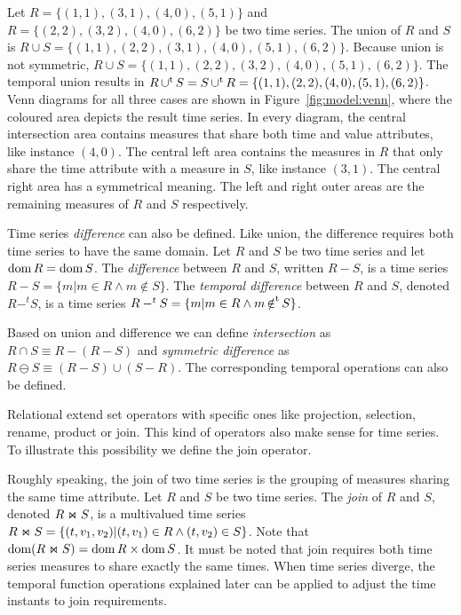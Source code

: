 \begin{example}\label{ex:model:s1s2}
  Let $R=\{(1,1), (3,1), (4,0), (5,1)\}$ and $R=\{(2,2), (3,2), (4,0),
  (6,2)\}$ be two time series. The union of $R$ and $S$ is $R\cup
  S=\{(1,1), (2,2), (3,1), (4,0), (5,1), (6,2)\}$. Because union is
  not symmetric, $R\cup S=\{(1,1), (2,2), \allowbreak(3,2), (4, 0), (5,1),
  (6,2)\}$. The temporal union results in $R\operatorname*{\cup^t} S= S \operatorname*{\cup^t}
  R=\{(1,1), (2,2), (4,0), (5,1), (6,2)\}$.  
  Venn diagrams for all three cases are shown in
  Figure~\ref{fig:model:venn}, where the coloured area depicts the
  result time series. In every diagram, the central intersection area
  contains measures that share both time and value attributes, like
  instance $(4,0)$. The central left area contains the measures in $R$
  that only share the time attribute with a measure in $S$, like
  instance $(3,1)$. The central right area has a symmetrical
  meaning. The left and right outer areas are the remaining measures
  of $R$ and $S$ respectively.
\end{example}




Time series \emph{difference} can also be defined. Like union, the
difference requires both time series to have the same domain.
%
Let $R$ and $S$ be two time series and let $\operatorname{dom} R = \operatorname{dom} S$.
%
The \emph{difference} between $R$ and $S$, written $R-S$, is a time
series $R-S=\{m|m\in R\wedge m\notin S\}$.
%
The \emph{temporal difference} between $R$ and $S$, denoted $R-^t S$, 
is a time series $R-^tS=\{m|m\in R\wedge m \operatorname*{\notin^t} S\}$.


Based on union and difference we can define \emph{intersection} as
$R\cap S \equiv R - (R - S)$ and \emph{symmetric difference}
as $R \ominus S \equiv (R - S) \cup (S - R)$. The
corresponding temporal operations can also be defined.


Relational  extend set operators with specific ones like
projection, selection, rename, product or join. This kind of operators
also make sense for time series. To illustrate this possibility we
define the join operator.

Roughly speaking, the join of two time series is the grouping of
measures sharing the same time attribute.  Let $R$ and $S$ be two time
series.  The \emph{join} of $R$ and $S$, denoted $R \Join S$, is a
multivalued time series $R \Join S = \{ (t,v_1,v_2) | (t,v_1) \in
R\wedge (t,v_2) \in S\}$. Note that $\operatorname{dom}(R\Join
S)=\operatorname{dom} R\times\operatorname{dom} S$.
%
It must be noted that join requires both time series measures to share
exactly the same times. When time series diverge, the temporal
function operations explained later can be applied to adjust the time
instants to join requirements.


